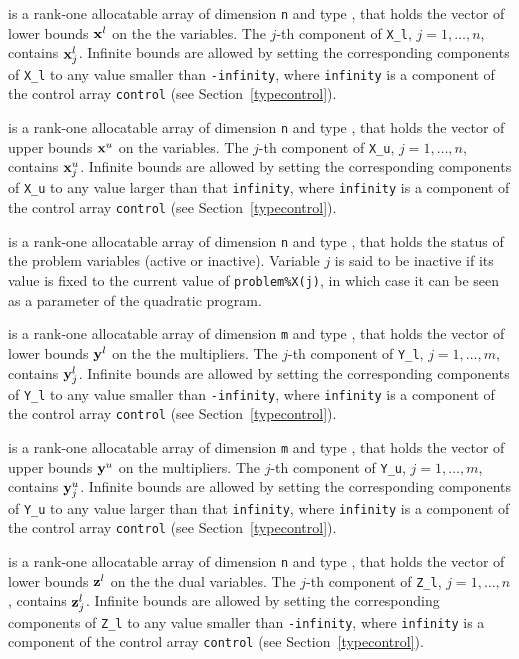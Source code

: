 \documentclass{galahad}
\begin{document}
\begin{description}
 is a rank-one allocatable array of dimension {\tt n} and type
\realdp, that holds
the vector of lower bounds ${\mathbf{x}}^{l}$ on the the variables.
The $j$-th component of {\tt X\_l}, $j = 1, \ldots , n$,
contains ${\mathbf{x}}_{j}^{l}$.
Infinite bounds are allowed by setting the corresponding
components of {\tt X\_l} to any value smaller than {\tt -infinity},
where {\tt infinity} is a component of the control array {\tt control}
(see Section~\ref{typecontrol}).

 is a rank-one allocatable array of dimension {\tt n} and type
\realdp, that holds
the vector of upper bounds ${\mathbf{x}}^{u}$ on the variables.
The $j$-th component of {\tt X\_u}, $j = 1, \ldots , n$,
contains ${\mathbf{x}}_{j}^{u}$.
Infinite bounds are allowed by setting the corresponding
components of {\tt X\_u} to any value larger than that {\tt infinity},
where {\tt infinity} is a component of the control array {\tt control}
(see Section~\ref{typecontrol}).

 is a rank-one allocatable array of dimension {\tt n} and type
\integer, that holds the status of the problem variables (active or
inactive). Variable $j$ is said to be inactive if its value is fixed to the
current value of {\tt problem\%X(j)}, in which case it can be seen as a
parameter of the quadratic program.

 is a rank-one allocatable array of dimension {\tt m} and type
\realdp, that holds
the vector of lower bounds ${\mathbf{y}}^{l}$ on the the multipliers.
The $j$-th component of {\tt Y\_l}, $j = 1, \ldots , m$,
contains ${\mathbf{y}}_{j}^{l}$.
Infinite bounds are allowed by setting the corresponding
components of {\tt Y\_l} to any value smaller than {\tt -infinity},
where {\tt infinity} is a component of the control array {\tt control}
(see Section~\ref{typecontrol}).

 is a rank-one allocatable array of dimension {\tt m} and type
\realdp, that holds
the vector of upper bounds ${\mathbf{y}}^{u}$ on the multipliers.
The $j$-th component of {\tt Y\_u}, $j = 1, \ldots , m$,
contains ${\mathbf{y}}_{j}^{u}$.
Infinite bounds are allowed by setting the corresponding
components of {\tt Y\_u} to any value larger than that {\tt infinity},
where {\tt infinity} is a component of the control array {\tt control}
(see Section~\ref{typecontrol}).

 is a rank-one allocatable array of dimension {\tt n} and type
\realdp, that holds
the vector of lower bounds ${\mathbf{z}}^{l}$ on the the dual variables.
The $j$-th component of {\tt Z\_l}, $j = 1, \ldots , n$,
contains ${\mathbf{z}}_{j}^{l}$.
Infinite bounds are allowed by setting the corresponding
components of {\tt Z\_l} to any value smaller than {\tt -infinity},
where {\tt infinity} is a component of the control array {\tt control}
(see Section~\ref{typecontrol}).


\end{description}
\end{document}

